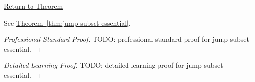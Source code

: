 \newpage
{}
\label{prf:jump-subset-essential}

\begin{remark*}[Return]
\hyperref[thm:jump-subset-essential]{Return to Theorem}
\end{remark*}

\begin{theorem*}
See \hyperref[thm:jump-subset-essential]{Theorem~\ref*{thm:jump-subset-essential}}.
\end{theorem*}

\begin{proof}[Professional Standard Proof]
\LRAProofBodyStart
TODO: professional standard proof for jump-subset-essential.
\end{proof}

\begin{proof}[Detailed Learning Proof]
\LRAProofBodyStart
TODO: detailed learning proof for jump-subset-essential.
\end{proof}

\begin{remark*}
\end{remark*}

\begin{dependencies}
\NoLocalDependencies
\end{dependencies}

\clearpage
